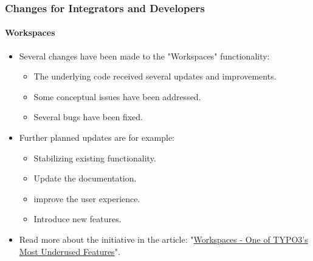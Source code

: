 %

\begin{frame}[fragile]
	\frametitle{Changes for Integrators and Developers}
	\framesubtitle{Workspaces}

	\begin{itemize}
		\item Several changes have been made to the "Workspaces" functionality:

			\begin{itemize}
				\item The underlying code received several updates and improvements.
				\item Some conceptual issues have been addressed.
				\item Several bugs have been fixed.
			\end{itemize}

		\item Further planned updates are for example:

			\begin{itemize}
				\item Stabilizing existing functionality.
				\item Update the documentation.
				\item improve the user experience.
				\item Introduce new features.
			\end{itemize}

		\item Read more about the initiative in the article:\newline
			"\href{https://typo3.org/article/workspaces-one-of-typo3s-most-underused-features}{Workspaces - One of TYPO3's Most Underused Features}".

	\end{itemize}

\end{frame}

